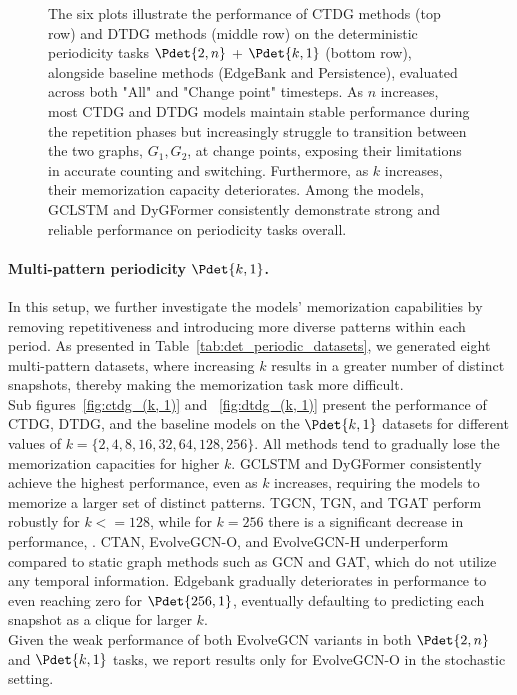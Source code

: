 \begin{figure}[t]
    \caption{
    The six plots illustrate the performance of CTDG methods (top row) and DTDG methods (middle row) on the deterministic periodicity tasks $\Pdet{2, n}$ + $\Pdet{k, 1}$ (bottom row), alongside baseline methods (EdgeBank and Persistence), evaluated across both "All" and "Change point" timesteps. As $n$ increases, most CTDG and DTDG models maintain stable performance during the repetition phases but increasingly struggle to transition between the two graphs, ${G_1, G_2}$, at change points, exposing their limitations in accurate counting and switching. Furthermore, as $k$ increases, their memorization capacity deteriorates. Among the models, GCLSTM and DyGFormer consistently demonstrate strong and reliable performance on periodicity tasks overall.
    }
    \label{fig:det_periodic_overall}
\end{figure}

\paragraph{Multi-pattern periodicity $\Pdet{k, 1}$.}

In this setup, we further investigate the models' memorization capabilities by removing repetitiveness and introducing more diverse patterns within each period. As presented in Table~\ref{tab:det_periodic_datasets}, we generated eight multi-pattern datasets, where increasing $k$ results in a greater number of distinct snapshots, thereby making the memorization task more difficult.\\
Sub figures~\ref{fig:ctdg_(k, 1)} and ~\ref{fig:dtdg_(k, 1)} present the performance of CTDG, DTDG, and the baseline models on the $\Pdet{k, 1}$ datasets for different values of $k = \{2, 4, 8, 16, 32, 64, 128, 256\}$. All methods tend to gradually lose the memorization capacities for higher $k$. GCLSTM and DyGFormer consistently achieve the highest performance, even as $k$ increases, requiring the models to memorize a larger set of distinct patterns. TGCN, TGN, and TGAT perform robustly for $k <= 128$, while for $k=256$ there is a significant decrease in performance, . CTAN, EvolveGCN-O, and EvolveGCN-H underperform compared to static graph methods such as GCN and GAT, which do not utilize any temporal information. Edgebank gradually deteriorates in performance to even reaching zero for $\Pdet{256, 1}$, eventually defaulting to predicting each snapshot as a clique for larger $k$. \\
Given the weak performance of both EvolveGCN variants in both $\Pdet{2, n}$ and $\Pdet{k, 1}$ tasks, we report results only for EvolveGCN-O in the stochastic setting.


